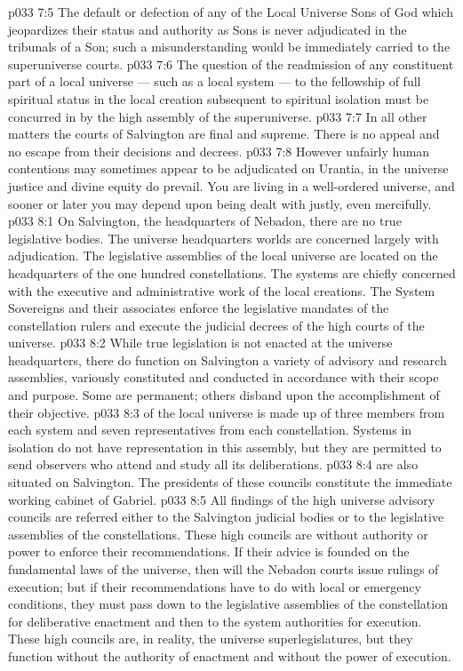 \vs p033 7:5 \pc {}\bibnobreakspace The default or defection of any of the Local Universe Sons of God which jeopardizes their status and authority as Sons is never adjudicated in the tribunals of a Son; such a misunderstanding would be immediately carried to the superuniverse courts.
\vs p033 7:6 \pc {}\bibnobreakspace The question of the readmission of any constituent part of a local universe --- such as a local system --- to the fellowship of full spiritual status in the local creation subsequent to spiritual isolation must be concurred in by the high assembly of the superuniverse.
\vs p033 7:7 \pc In all other matters the courts of Salvington are final and supreme. There is no appeal and no escape from their decisions and decrees.
\vs p033 7:8 However unfairly human contentions may sometimes appear to be adjudicated on Urantia, in the universe justice and divine equity do prevail. You are living in a well\hyp{}ordered universe, and sooner or later you may depend upon being dealt with justly, even mercifully.
\vs p033 8:1 On Salvington, the headquarters of Nebadon, there are no true legislative bodies. The universe headquarters worlds are concerned largely with adjudication. The legislative assemblies of the local universe are located on the headquarters of the one hundred constellations. The systems are chiefly concerned with the executive and administrative work of the local creations. The System Sovereigns and their associates enforce the legislative mandates of the constellation rulers and execute the judicial decrees of the high courts of the universe.
\vs p033 8:2 While true legislation is not enacted at the universe headquarters, there do function on Salvington a variety of advisory and research assemblies, variously constituted and conducted in accordance with their scope and purpose. Some are permanent; others disband upon the accomplishment of their objective.
\vs p033 8:3 \pc {} of the local universe is made up of three members from each system and seven representatives from each constellation. Systems in isolation do not have representation in this assembly, but they are permitted to send observers who attend and study all its deliberations.
\vs p033 8:4 \pc {} are also situated on Salvington. The presidents of these councils constitute the immediate working cabinet of Gabriel.
\vs p033 8:5 \pc All findings of the high universe advisory councils are referred either to the Salvington judicial bodies or to the legislative assemblies of the constellations. These high councils are without authority or power to enforce their recommendations. If their advice is founded on the fundamental laws of the universe, then will the Nebadon courts issue rulings of execution; but if their recommendations have to do with local or emergency conditions, they must pass down to the legislative assemblies of the constellation for deliberative enactment and then to the system authorities for execution. These high councils are, in reality, the universe superlegislatures, but they function without the authority of enactment and without the power of execution.

